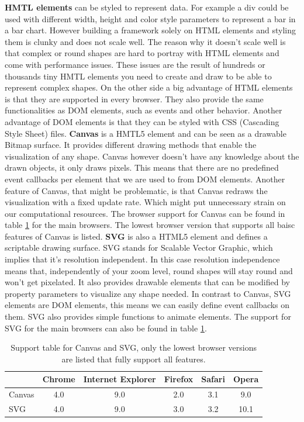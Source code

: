 \documentclass{bioinfo}
\begin{document}
\textbf{HMTL elements} can be styled to represent data. For example a div could be used with different width, height and color style parameters to represent a bar in a bar chart.
However building a framework solely on HTML elements and styling them is clunky and does not scale well.
The reason why it doesn't scale well is that complex or round shapes are hard to portray with HTML elements and come with performance issues. These issues are the result of hundreds or thousands tiny HMTL elements you need to create and draw to be able to represent complex shapes.
On the other side a big advantage of HTML elements is that they are supported in every browser.
They also provide the same functionalities as DOM elements, such as events and other behavior.
Another advantage of DOM elements is that they can be styled with CSS (Cascading Style Sheet) files.
\newline
\textbf{Canvas} is a HMTL5 element and can be seen as a drawable Bitmap surface.
It provides different drawing methods that enable the visualization of any shape.
Canvas however doesn't have any knowledge about the drawn objects, it only draws pixels.
This means that there are no predefined event callbacks per element that we are used to from DOM elements.
Another feature of Canvas, that might be problematic, is that Canvas redraws the visualization with a fixed update rate. Which might put unnecessary strain on our computational resources.
The browser support for Canvas can be found in table \ref{t:support} for the main browsers. The lowest browser version that supports all baisc features of Canvas  is listed.
\newline
\textbf{SVG} is also a HTML5 element and defines a scriptable drawing surface. SVG stands for Scalable Vector Graphic, which implies that it's resolution independent. In this case resolution independence means that, independently of your zoom level, round shapes will stay round and won't get pixelated. 
It also provides drawable elements that can be modified by property parameters to visualize any shape needed. In contrast to Canvas, SVG elements are DOM elements, this means we can easily define event callbacks on them. SVG also provides simple functions to animate elements.
The support for SVG for the main browsers can also be found in table \ref{t:support}.

\begin{table}
\begin{tabular}{ l | c | c | c | c | c } 
		& Chrome & Internet Explorer & Firefox & Safari & Opera \\
\hline
Canvas	& 4.0 & 9.0 & 2.0 &	3.1 & 9.0 \\
SVG		& 4.0 & 9.0 & 3.0 &	3.2 & 10.1 \\
\end{tabular}
\caption{Support table for Canvas and SVG, only the lowest browser versions are listed that fully support all features.} \label{t:support}
\end{table}
\end{document}

